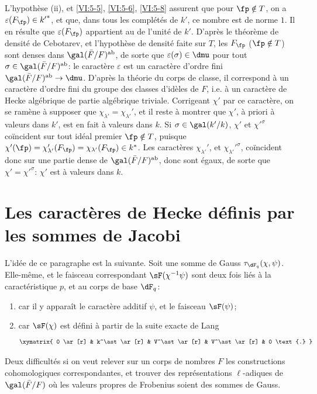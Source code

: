 L'hypothèse (ii), et \ref{VI:5-5}, \ref{VI:5-6}, \ref{VI:5-8} assurent que 
pour $\fp\notin T$, on a $\varepsilon(F_\fp)\in {k'}^\ast$, et que, dans tous 
les complétés de $k'$, ce nombre est de norme $1$. Il en résulte que 
$\varepsilon(F_\fp)$ appartient au  de l'unité 
de $k'$. D'après le théorème de densité de Cebotarev, et l'hypothèse 
de densité faite sur $T$, les $F_\fp$ ($\fp\notin T$) sont denses dans 
$\gal(\bar F/F)^\text{ab}$, de sorte que $\varepsilon(\sigma)\in \dmu$ pour tout 
$\sigma\in \gal(\bar F/F)^\text{ab}$: le caractère $\varepsilon$ est un 
caractère d'ordre fini $\gal(\bar F/F)^\text{ab}\to \dmu$. D'après la 
théorie du corps de classe, il correspond à un caractère d'ordre fini 
du groupe des classes d'idèles de $F$, i.e. à un caractère de Hecke 
algébrique de partie algébrique triviale. Corrigeant $\chi'$ par ce 
caractère, on se ramène à supposer que 
$\chi_{\lambda'}=\chi_{\lambda'}'$,  et il reste à montrer que $\chi'$, à 
priori à valeurs dans $k'$, est en fait à valeurs dans $k$. Si 
$\sigma\in \gal(k'/k)$, $\chi'$ et ${\chi'}^\sigma$ coïncident sur tout idéal 
premier $\fp\notin T$, puisque 
$\chi'(\fp) = \chi'_{\lambda'}(F_\fp) = \chi_{\lambda'}(F_\fp) \in k^\ast$. 
Les caractères $\chi_{\lambda'}'$, et ${\chi_{\lambda'}'}^\sigma$, coïncident 
donc sur une partie dense de $\gal(\bar F/F)^\text{ab}$, donc sont égaux, de 
sorte que $\chi'={\chi'}^\sigma$: $\chi'$ est à valeurs dans $k$. 











\section{Les caractères de Hecke définis par les sommes de Jacobi}\label{VI:6}

L'idée de ce paragraphe est la suivante. Soit une somme de Gauss 
$\tau_{\dF_q}(\chi,\psi)$. Elle-même, et le faisceau correspondant 
$\sF(\chi^{-1}\psi)$ sont deux fois liés à la caractéristique $p$, et au 
corps de base $\dF_q$: 
\begin{enumerate}[\indent a)]
  \item car il y appara\^it le caractère additif $\psi$, et le faisceau 
    $\sF(\psi)$; 
  \item car $\sF(\chi)$ est défini à partir de la suite exacte de Lang 
    \[\xymatrix{
      0 \ar[r] 
        & k^\ast \ar[r] 
        & V^\ast \ar[r] 
        & V^\ast \ar[r] 
        & 0 \text{.} 
    }\]
\end{enumerate}
Deux difficultés si on veut relever sur un corps de nombres $F$ les 
constructions cohomologiques correspondantes, et trouver des 
représentations $\ell$-adiques de $\gal(\bar F/F)$ où les valeurs propres 
de Frobenius soient des sommes de Gauss. 

